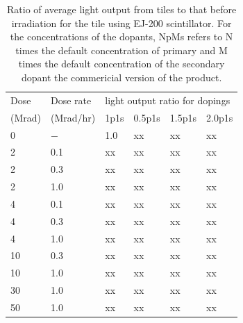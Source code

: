 \documentclass[review]{elsarticle}
\begin{document}
\begin{table}[thb]
\centering
\caption{
Ratio of average light output from tiles to that before irradiation
for the tile using EJ-200 scintillator.  For the concentrations
of the dopants, NpMs refers to N times the default concentration of primary and M times the default concentration of the secondary dopant
the commericial version of the product.
}
\label{tab:ResultsEJ200}
{\small
\begin{tabular}{|l| l| l| l| l| l|}
\hline
Dose & Dose rate  &\multicolumn{4}{|l|}{light output ratio for dopings} \\
(Mrad)  & (Mrad/hr) & 1p1s & 0.5p1s & 1.5p1s & 2.0p1s   \\
\hline
\hline
0 & $-$ & 1.0 & {\color{red} xx} & {\color{red} xx} & {\color{red} xx}\\ \hline
2 & 0.1 & {\color{red} xx} & {\color{red} xx} & {\color{red} xx} & {\color{red} xx}\\
2 & 0.3 & {\color{red} xx} & {\color{red} xx} & {\color{red} xx} & {\color{red} xx}\\
2 & 1.0 & {\color{red} xx} & {\color{red} xx} & {\color{red} xx} & {\color{red} xx}\\ \hline
4 & 0.1 & {\color{red} xx} & {\color{red} xx} & {\color{red} xx} & {\color{red} xx}\\
4 & 0.3 & {\color{red} xx} & {\color{red} xx} & {\color{red} xx} & {\color{red} xx}\\
4 & 1.0 & {\color{red} xx} & {\color{red} xx} & {\color{red} xx} & {\color{red} xx}\\ \hline
10 & 0.3 & {\color{red} xx} & {\color{red} xx} & {\color{red} xx} & {\color{red} xx}\\
10 & 1.0 & {\color{red} xx} & {\color{red} xx} & {\color{red} xx} & {\color{red} xx}\\ \hline
30 & 1.0 & {\color{red} xx} & {\color{red} xx} & {\color{red} xx} & {\color{red} xx}\\ \hline
50 & 1.0 & {\color{red} xx} & {\color{red} xx} & {\color{red} xx} & {\color{red} xx}\\ \hline
\hline
\end{tabular}
}
\end{table}
\end{document}
